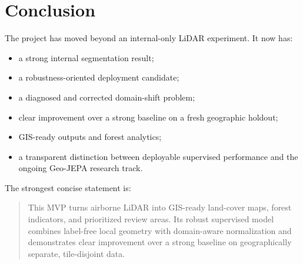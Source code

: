 \documentclass[11pt,a4paper]{article}
\begin{document}
\section{Conclusion}

The project has moved beyond an internal-only LiDAR experiment. It now has:

\begin{itemize}
  \item a strong internal segmentation result;
  \item a robustness-oriented deployment candidate;
  \item a diagnosed and corrected domain-shift problem;
  \item clear improvement over a strong baseline on a fresh geographic holdout;
  \item GIS-ready outputs and forest analytics;
  \item a transparent distinction between deployable supervised performance and the ongoing Geo-JEPA research track.
\end{itemize}

The strongest concise statement is:

\begin{quote}
This MVP turns airborne LiDAR into GIS-ready land-cover maps, forest indicators, and prioritized review areas. Its robust supervised model combines label-free local geometry with domain-aware normalization and demonstrates clear improvement over a strong baseline on geographically separate, tile-disjoint data.
\end{quote}
\end{document}
